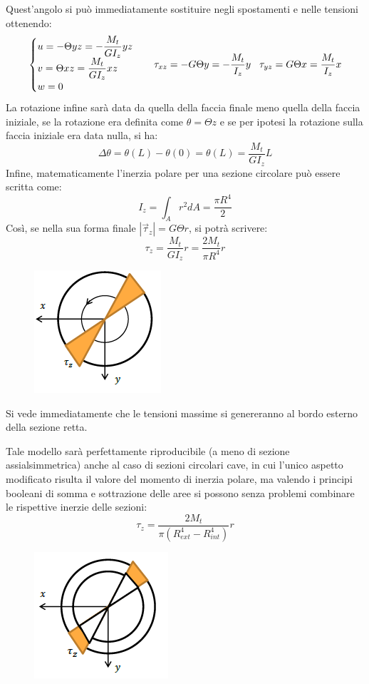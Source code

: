 			Quest'angolo si può immediatamente sostituire negli spostamenti e nelle tensioni ottenendo: 
			\[ \begin{cases}
				u = -\Theta yz = -\dfrac{M_t}{GI_z}yz \\
				v =  \Theta xz = \dfrac{M_t}{GI_z} xz\\
				w = 0
			\end{cases} \hspace{0.3cm} \tau_{xz} = -G\Theta y = -\dfrac{M_t}{I_z}y  \hspace{0.3cm} \tau_{yz} = G\Theta x = \dfrac{M_t}{I_z}x\]
			La rotazione infine sarà data da quella della faccia finale meno quella della faccia iniziale, se la rotazione era definita come $\theta = \Theta z$ e se per ipotesi la rotazione sulla faccia iniziale era data nulla, si ha: 
			\[\Delta\theta = \theta(L) - \theta(0) = \theta(L) = \dfrac{M_t}{GI_z}L\]
			Infine, matematicamente l'inerzia polare per una sezione circolare può essere scritta come: 
			\[ I_z = \int_A r^2dA = \dfrac{\pi R^4}{2}\]
			Così, se nella sua forma finale $|\vec{\tau}_z| = G\Theta r$, si potrà scrivere:
			\[ \boxed{\tau_z = \dfrac{M_t}{GI_z}r = \dfrac{2M_t}{\pi R^4}r} \]
			\begin{figure}[H]
				\centering
				\includegraphics[width=0.2\linewidth]{immagini_5/screenshot002}
				\label{fig:screenshot002}
			\end{figure}
			
			Si vede immediatamente che le tensioni massime si genereranno al bordo esterno della sezione retta.\newline 
			
			Tale modello sarà perfettamente riproducibile (a meno di sezione assialsimmetrica) anche al caso di sezioni circolari cave, in cui l’unico aspetto
			modificato risulta il valore del momento di inerzia polare, ma valendo i principi booleani di somma e sottrazione delle aree si possono senza problemi combinare le rispettive inerzie delle sezioni: 
			\[ \boxed{\tau_z = \dfrac{2M_t}{\pi (R_{ext}^4-R_{int}^4)}r} \]
			
\begin{figure}[H]
	\centering
	\includegraphics[width=0.2\linewidth]{immagini_5/screenshot001}
	\label{fig:screenshot001}
\end{figure}


